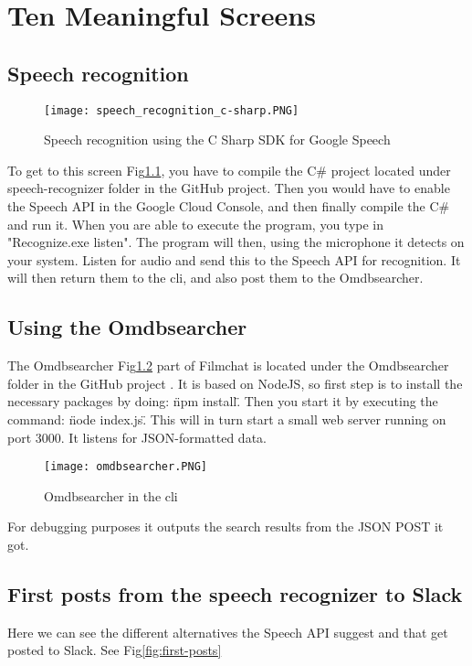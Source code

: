 \documentclass[11pt,fleqn]{book} %
\begin{document}

\chapter{Ten Meaningful Screens}
\section{Speech recognition}
\begin{figure}[]
  \centering
   \texttt{[image: speech\_recognition\_c-sharp.PNG]}
  \caption{Speech recognition using the C Sharp SDK for Google Speech}
  \label{fig:c-sharp-speech}
\end{figure}
To get to this screen Fig\ref{fig:c-sharp-speech}, you have to compile the C\# project located under speech-recognizer folder in the GitHub project. \cite{Github2017GitHubProject}
Then you would have to enable the Speech API in the Google Cloud Console, and then finally compile the C\# and run it.
When you are able to execute the program, you type in "Recognize.exe listen". The program will then, using the microphone it detects on your system. Listen for audio and send this to the Speech API for recognition. It will then return them to the cli, and also post them to the Omdbsearcher.

\newpage
\section{Using the Omdbsearcher}
The Omdbsearcher Fig\ref{fig:omdbsearcher} part of Filmchat is located under the Omdbsearcher folder in the GitHub project \cite{Github2017GitHubProject}. It is based on NodeJS, so first step is to install the necessary packages by doing: \"npm install\". Then you start it by executing the command: \"node index.js\". This will in turn start a small web server running on port 3000.
It listens for JSON-formatted data.
\begin{figure}[]
  \centering
   \texttt{[image: omdbsearcher.PNG]}
  \caption{Omdbsearcher in the cli}
  \label{fig:omdbsearcher}
\end{figure}
For debugging purposes it outputs the search results from the JSON POST it got.

\newpage
\section{First posts from the speech recognizer to Slack}
Here we can see the different alternatives the Speech API suggest and that get posted to Slack. See Fig\ref{fig:first-posts}
\end{document}
